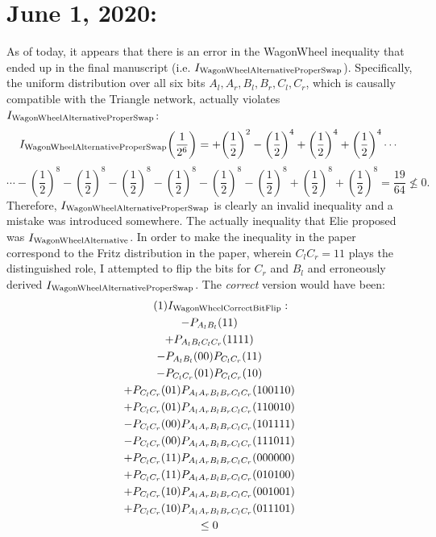 \documentclass[aps, 10pt, english, twoside, pra, nofootinbib, tightenlines, longbibliography, superscriptaddress]{revtex4-1}
\begin{document}
    \section{June 1, 2020:}
    As of today, it appears that there is an error in the WagonWheel inequality that ended up in the final manuscript (i.e. $I_\text{WagonWheelAlternativeProperSwap}$). Specifically, the uniform distribution over all six bits $A_l, A_r, B_l, B_r, C_l, C_r$, which is causally compatible with the Triangle network, actually violates $I_\text{WagonWheelAlternativeProperSwap}$:  
    \[ I\tsb{WagonWheelAlternativeProperSwap}\left(\frac{1}{2^6}\right) = +\left(\frac{1}{2}\right)^2-\left(\frac{1}{2}\right)^4+\left(\frac{1}{2}\right)^4+\left(\frac{1}{2}\right)^4\cdots\]
    \[\cdots-\left(\frac{1}{2}\right)^8-\left(\frac{1}{2}\right)^8-\left(\frac{1}{2}\right)^8-\left(\frac{1}{2}\right)^8-\left(\frac{1}{2}\right)^8-\left(\frac{1}{2}\right)^8+\left(\frac{1}{2}\right)^8+\left(\frac{1}{2}\right)^8 = \frac{19}{64} \not \leq 0.\]
    Therefore, $I_\text{WagonWheelAlternativeProperSwap}$ is clearly an invalid inequality and a mistake was introduced somewhere. The actually inequality that Elie proposed was $I_\text{WagonWheelAlternative}$. In order to make the inequality in the paper correspond to the Fritz distribution in the paper, wherein $C_lC_r = 11$ plays the distinguished role, I attempted to flip the bits for $C_r$ and $B_l$ and erroneously derived $I_\text{WagonWheelAlternativeProperSwap}$. The \textit{correct} version would have been:
    \begin{equation*}
    \begin{gathered}
        \eq
        I\tsb{WagonWheelCorrectBitFlip} : \\
        -P_{A_{l}B_{l}}(11) \\
        +P_{A_{l}B_{l}C_{l}C_{r}}(1111) \\
        -P_{A_{l}B_{l}}(00) P_{C_{l}C_{r}}(11) \\
        -P_{C_{l}C_{r}}(01) P_{C_{l}C_{r}}(10) \\
        +P_{C_{l}C_{r}}(01) P_{A_{l}A_{r}B_{l}B_{r}C_{l}C_{r}}(100110) \\
        +P_{C_{l}C_{r}}(01) P_{A_{l}A_{r}B_{l}B_{r}C_{l}C_{r}}(110010) \\
        -P_{C_{l}C_{r}}(00) P_{A_{l}A_{r}B_{l}B_{r}C_{l}C_{r}}(101111) \\
        -P_{C_{l}C_{r}}(00) P_{A_{l}A_{r}B_{l}B_{r}C_{l}C_{r}}(111011) \\
        +P_{C_{l}C_{r}}(11) P_{A_{l}A_{r}B_{l}B_{r}C_{l}C_{r}}(000000) \\
        +P_{C_{l}C_{r}}(11) P_{A_{l}A_{r}B_{l}B_{r}C_{l}C_{r}}(010100) \\
        +P_{C_{l}C_{r}}(10) P_{A_{l}A_{r}B_{l}B_{r}C_{l}C_{r}}(001001) \\
        +P_{C_{l}C_{r}}(10) P_{A_{l}A_{r}B_{l}B_{r}C_{l}C_{r}}(011101) \\
        \leq 0
    \end{gathered}
    \end{equation*}
\end{document}
